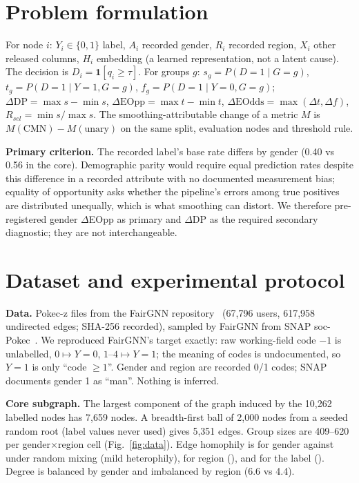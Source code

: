 \documentclass[11pt,a4paper]{article}
\begin{document}
\section{Problem formulation}
For node $i$: $Y_i\in\{0,1\}$ label, $A_i$ recorded gender, $R_i$ recorded region, $X_i$ other released columns, $H_i$ embedding (a learned representation, not a latent cause). The decision is $D_i=\mathbf 1[q_i\ge\tau]$. For groups $g$: $s_g=P(D{=}1\mid G{=}g)$, $t_g=P(D{=}1\mid Y{=}1,G{=}g)$, $f_g=P(D{=}1\mid Y{=}0,G{=}g)$; $\Delta\mathrm{DP}=\max s-\min s$, $\Delta\mathrm{EOpp}=\max t-\min t$, $\Delta\mathrm{EOdds}=\max(\Delta t,\Delta f)$, $R_{sel}=\min s/\max s$. The smoothing-attributable change of a metric $M$ is $M(\text{CMN})-M(\text{unary})$ on the same split, evaluation nodes and threshold rule.

\textbf{Primary criterion.} The recorded label's base rate differs by gender (0.40 vs 0.56 in the core). Demographic parity would require equal prediction rates despite this difference in a recorded attribute with no documented measurement bias; equality of opportunity asks whether the pipeline's errors among true positives are distributed unequally, which is what smoothing can distort. We therefore pre-registered gender $\Delta$EOpp as primary and $\Delta$DP as the required secondary diagnostic; they are not interchangeable.

\section{Dataset and experimental protocol}
\textbf{Data.} Pokec-z files from the FairGNN repository~\cite{fairgnn} (67{,}796 users, 617{,}958 undirected edges; SHA-256 recorded), sampled by FairGNN from SNAP soc-Pokec~\cite{pokec}. We reproduced FairGNN's target exactly: raw working-field code $-1$ is unlabelled, $0\mapsto Y{=}0$, $1$--$4\mapsto Y{=}1$; the meaning of codes is undocumented, so $Y{=}1$ is only ``code $\ge1$''. Gender and region are recorded 0/1 codes; SNAP documents gender 1 as ``man''. Nothing is inferred.

\textbf{Core subgraph.} The largest component of the graph induced by the 10{,}262 labelled nodes has 7{,}659 nodes. A breadth-first ball of 2{,}000 nodes from a seeded random root (label values never used) gives 5{,}351 edges. Group sizes are 409--620 per gender$\times$region cell (Fig.~\ref{fig:data}). Edge homophily is \RHomGender{} for gender against \RHomGenderRand{} under random mixing (mild heterophily), \RHomRegion{} for region (\RHomRegionRand), and \RHomLabel{} for the label (\RHomLabelRand). Degree is balanced by gender and imbalanced by region (6.6 vs 4.4).
\end{document}
